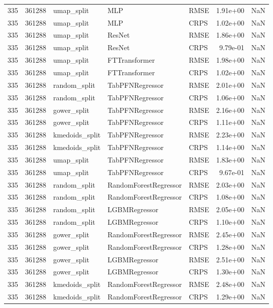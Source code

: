 \begin{tabular}{rrlllrr}
335 & 361288 & umap\_split & MLP & RMSE & 1.91e+00 & NaN \\
335 & 361288 & umap\_split & MLP & CRPS & 1.02e+00 & NaN \\
335 & 361288 & umap\_split & ResNet & RMSE & 1.86e+00 & NaN \\
335 & 361288 & umap\_split & ResNet & CRPS & 9.79e-01 & NaN \\
335 & 361288 & umap\_split & FTTransformer & RMSE & 1.98e+00 & NaN \\
335 & 361288 & umap\_split & FTTransformer & CRPS & 1.02e+00 & NaN \\
335 & 361288 & random\_split & TabPFNRegressor & RMSE & 2.01e+00 & NaN \\
335 & 361288 & random\_split & TabPFNRegressor & CRPS & 1.06e+00 & NaN \\
335 & 361288 & gower\_split & TabPFNRegressor & RMSE & 2.16e+00 & NaN \\
335 & 361288 & gower\_split & TabPFNRegressor & CRPS & 1.11e+00 & NaN \\
335 & 361288 & kmedoids\_split & TabPFNRegressor & RMSE & 2.23e+00 & NaN \\
335 & 361288 & kmedoids\_split & TabPFNRegressor & CRPS & 1.14e+00 & NaN \\
335 & 361288 & umap\_split & TabPFNRegressor & RMSE & 1.83e+00 & NaN \\
335 & 361288 & umap\_split & TabPFNRegressor & CRPS & 9.67e-01 & NaN \\
335 & 361288 & random\_split & RandomForestRegressor & RMSE & 2.03e+00 & NaN \\
335 & 361288 & random\_split & RandomForestRegressor & CRPS & 1.08e+00 & NaN \\
335 & 361288 & random\_split & LGBMRegressor & RMSE & 2.05e+00 & NaN \\
335 & 361288 & random\_split & LGBMRegressor & CRPS & 1.10e+00 & NaN \\
335 & 361288 & gower\_split & RandomForestRegressor & RMSE & 2.45e+00 & NaN \\
335 & 361288 & gower\_split & RandomForestRegressor & CRPS & 1.28e+00 & NaN \\
335 & 361288 & gower\_split & LGBMRegressor & RMSE & 2.51e+00 & NaN \\
335 & 361288 & gower\_split & LGBMRegressor & CRPS & 1.30e+00 & NaN \\
335 & 361288 & kmedoids\_split & RandomForestRegressor & RMSE & 2.48e+00 & NaN \\
335 & 361288 & kmedoids\_split & RandomForestRegressor & CRPS & 1.29e+00 & NaN \\

\end{tabular}
